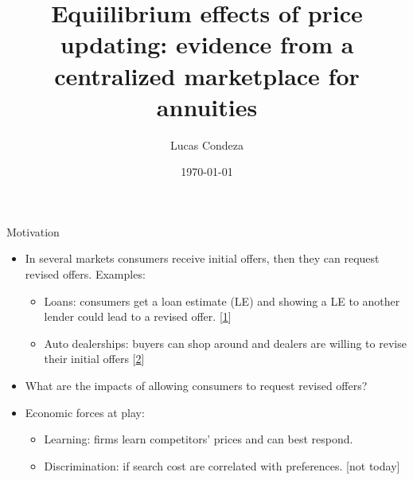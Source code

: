 \documentclass[10pt,aspectratio=169]{beamer}
\title{Equiilibrium effects of price updating: evidence from a centralized marketplace for annuities}
\author{%
 Lucas Condeza
\inst{1} \and
}
\institute{
  \inst{1} Yale University \\
}
\date{\today}
\begin{document}
\begin{frame}
  \titlepage
\end{frame}




\begin{frame}{Motivation} 
\begin{itemize}
    \item  In several markets consumers receive initial offers, then they can request revised offers. Examples: 
    \begin{itemize}
        \item Loans: consumers get a loan estimate (LE) and showing a LE to another lender could lead to a revised offer. [\href{https://chatgpt.com/share/68eaf593-1518-800d-b874-1fba1adbe177}{1}]
        \item Auto dealerships: buyers can shop around and dealers are willing to revise their initial offers [\href{https://chatgpt.com/share/68eaf593-1518-800d-b874-1fba1adbe177}{2}]
    \end{itemize}

    \item What are the impacts of allowing consumers to request revised offers?
    \item Economic forces at play: 
    \begin{itemize}
        \item Learning: firms learn competitors' prices and can best respond.
        \item Discrimination: if search cost are correlated with preferences. [not today] 
    \end{itemize}
\end{itemize}
\end{frame}

\end{document}
